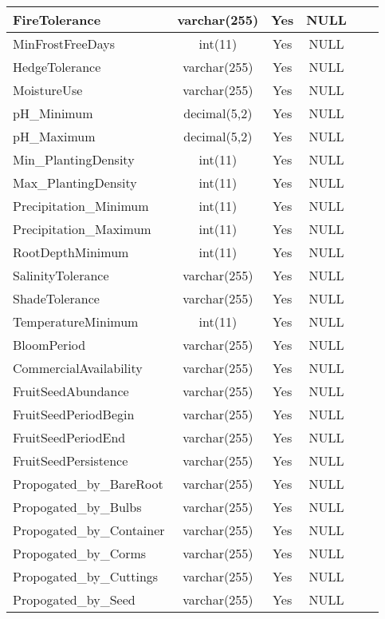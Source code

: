 \begin{enumerate}
\begin{longtable}{|l|c|c|c|l|l|}
FireTolerance & varchar(255) & Yes & NULL &  &  \\ \hline 
MinFrostFreeDays & int(11) & Yes & NULL &  &  \\ \hline 
HedgeTolerance & varchar(255) & Yes & NULL &  &  \\ \hline 
MoistureUse & varchar(255) & Yes & NULL &  &  \\ \hline 
pH\_Minimum & decimal(5,2) & Yes & NULL &  &  \\ \hline 
pH\_Maximum & decimal(5,2) & Yes & NULL &  &  \\ \hline 
Min\_PlantingDensity & int(11) & Yes & NULL &  &  \\ \hline 
Max\_PlantingDensity & int(11) & Yes & NULL &  &  \\ \hline 
Precipitation\_Minimum & int(11) & Yes & NULL &  &  \\ \hline 
Precipitation\_Maximum & int(11) & Yes & NULL &  &  \\ \hline 
RootDepthMinimum & int(11) & Yes & NULL &  &  \\ \hline 
SalinityTolerance & varchar(255) & Yes & NULL &  &  \\ \hline 
ShadeTolerance & varchar(255) & Yes & NULL &  &  \\ \hline 
TemperatureMinimum & int(11) & Yes & NULL &  &  \\ \hline 
BloomPeriod & varchar(255) & Yes & NULL &  &  \\ \hline 
CommercialAvailability & varchar(255) & Yes & NULL &  &  \\ \hline 
FruitSeedAbundance & varchar(255) & Yes & NULL &  &  \\ \hline 
FruitSeedPeriodBegin & varchar(255) & Yes & NULL &  &  \\ \hline 
FruitSeedPeriodEnd & varchar(255) & Yes & NULL &  &  \\ \hline 
FruitSeedPersistence & varchar(255) & Yes & NULL &  &  \\ \hline 
Propogated\_by\_BareRoot & varchar(255) & Yes & NULL &  &  \\ \hline 
Propogated\_by\_Bulbs & varchar(255) & Yes & NULL &  &  \\ \hline 
Propogated\_by\_Container & varchar(255) & Yes & NULL &  &  \\ \hline 
Propogated\_by\_Corms & varchar(255) & Yes & NULL &  &  \\ \hline 
Propogated\_by\_Cuttings & varchar(255) & Yes & NULL &  &  \\ \hline 
Propogated\_by\_Seed & varchar(255) & Yes & NULL &  &  \\ \hline 

\end{longtable}
\end{enumerate}
